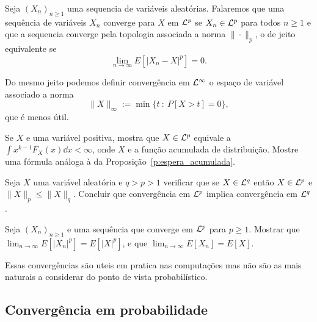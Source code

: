 \begin{definition}
Seja $(X_n)_{n\ge 1}$ uma sequencia de variáveis aleatórias.
Falaremos que uma sequência de variáveis $X_n$ converge para $X$
 em ${\mathcal L}^p$ se $X_n\in {\ensuremath{\mathcal L}}^p$ para todos $n\ge 1$ e que a sequencia converge pela topologia associada a norma $\| \cdot \|_p$, o de jeito equivalente se
 \begin{equation}
 \lim_{n\to \infty}  E[ |X_n-X|^p]=0.
 \end{equation}

\end{definition}


\begin{remark}
Do mesmo jeito podemos definir convergência em ${\mathcal L}^{\infty}$ o espaço de variável associado a norma
\begin{equation}
  \| X \|_\infty:= \min\{ t \ : \  P[X>t]=0 \},
\end{equation}
que é menos útil.
\end{remark}

\begin{exercise}
Se $X$ e uma variável positiva, mostra que $X\in {\ensuremath{\mathcal L}}^p$ equivale a $\int x^{k-1}F_X(x) \dd x <\infty$, onde $X$ e a função acumulada de distribuição.
  Mostre uma fórmula análoga à da Proposição~\ref{p:espera_acumulada}.
\end{exercise}



\begin{exercise}
Seja $X$ uma variável aleatória e $q>p>1$ verificar que se $X\in {\ensuremath{\mathcal L}}^q$ então
$X\in {\ensuremath{\mathcal L}}^p$ e $\|X\|_p\le \|X\|_q$.
Concluir que convergência em ${\mathcal L}^p$ implica convergência em ${\mathcal L}^q$.
\end{exercise}

\begin{exercise}\label{ex:l1}
Seja $(X_n)_{n\ge 1}$ e uma sequência que converge em ${\mathcal L}^p$ para $p\ge 1$.
Mostrar que $\lim_{n\to \infty} E[|X_n|^p]= E[|X|^p]$,
e que $\lim_{n\to \infty} E[X_n]= E[X]$.

\end{exercise}

Essas convergências são uteis em pratica nas computações mas não são as mais naturais a considerar do ponto de vista probabilístico.

\subsection{Convergência em probabilidade}

